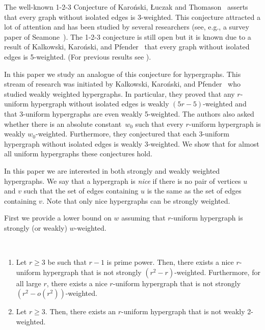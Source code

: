 \documentclass[12pt,reqno]{amsart}
\begin{document}
The well-known 1-2-3 Conjecture of Karo\'nski, \L{}uczak and Thomason~\cite{KLT} asserts that every graph without isolated edges is 3-weighted.
This conjecture attracted a lot of attention and has been studied by several researchers (see, e.g.,  a survey paper of Seamone~\cite{Seamone}). 
The 1-2-3 conjecture is still open but it is known due to a result of Kalkowski, Karo\'nski, and Pfender~\cite{5enough} that every graph without isolated edges is 5-weighted. (For previous results see  \cite{30enough, Gnp, 13enough}).

In this paper we study an analogue of this conjecture for hypergraphs. This stream of research was initiated by Kalkowski, Karo\'nski, and Pfender~\cite{KKP} who studied weakly weighted hypergraphs. In particular, they proved that any $r$-uniform hypergraph without isolated edges is weakly $(5r-5)$-weighted and that 3-uniform hypergraphs are even weakly 5-weighted. The authors also asked whether there is an absolute constant~$w_0$ such that every $r$-uniform hypergraph is weakly $w_0$-weighted. Furthermore, they conjectured that each 3-uniform hypergraph without isolated edges is weakly 3-weighted. We show that for almost all uniform hypergraphs these conjectures hold. 

In this paper we are interested in both strongly and weakly weighted hypergraphs. 
We say that a hypergraph is \emph{nice} if there is no pair of vertices $u$ and $v$ such that the set of edges containing $u$ is the same as the set of edges containing $v$. Note that only nice hypergraphs can be strongly weighted.

First we provide a lower bound on $w$ assuming that $r$-uniform hypergraph is strongly (or weakly) $w$-weighted.

\begin{theorem}\label{thm:lb}\ \\[-15pt]
\begin{enumerate}[label=(\roman*)]
\item\label{thm:lb:a} Let $r\ge 3$ be such that $r-1$ is prime power. Then, there exists a nice $r$-uniform hypergraph that is not strongly $(r^2-r)$-weighted. Furthermore, for all large $r$, there exists a nice $r$-uniform hypergraph that is not strongly $(r^2-o(r^2))$-weighted. 
\item\label{thm:lb:b} Let $r\ge 3$. Then, there exists an $r$-uniform hypergraph that is not weakly 2-weighted. 
\end{enumerate}
\end{theorem}
\end{document}
